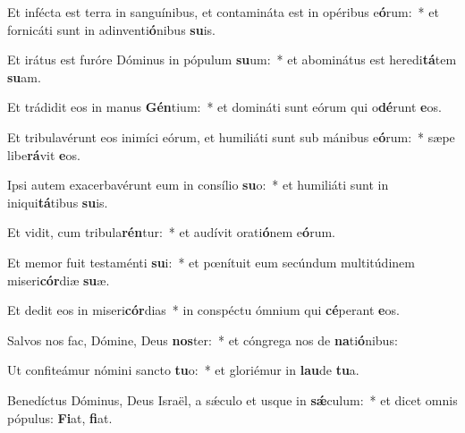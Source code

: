 \item Et infécta est terra in sanguínibus, et contamináta est in opéribus e\textbf{ó}rum:~* et fornicáti sunt in adinventi\textbf{ó}nibus \textbf{su}is.
\item Et irátus est furóre Dóminus in pópulum \textbf{su}um:~* et abominátus est heredi\textbf{tá}tem \textbf{su}am.
\item Et trádidit eos in manus \textbf{Gén}tium:~* et domináti sunt eórum qui o\textbf{dé}runt \textbf{e}os.
\item Et tribulavérunt eos inimíci eórum, et humiliáti sunt sub mánibus e\textbf{ó}rum:~* sæpe libe\textbf{rá}vit \textbf{e}os.
\item Ipsi autem exacerbavérunt eum in consílio \textbf{su}o:~* et humiliáti sunt in iniqui\textbf{tá}tibus \textbf{su}is.
\item Et vidit, cum tribula\textbf{rén}tur:~* et audívit orati\textbf{ó}nem e\textbf{ó}rum.
\item Et memor fuit testaménti \textbf{su}i:~* et pœnítuit eum secúndum multitúdinem miseri\textbf{cór}diæ \textbf{su}æ.
\item Et dedit eos in miseri\textbf{cór}dias~* in conspéctu ómnium qui \textbf{cé}perant \textbf{e}os.
\item Salvos nos fac, Dómine, Deus \textbf{nos}ter:~* et cóngrega nos de \textbf{na}ti\textbf{ó}nibus:
\item Ut confiteámur nómini sancto \textbf{tu}o:~* et gloriémur in \textbf{lau}de \textbf{tu}a.
\item Benedíctus Dóminus, Deus Israël, a sǽculo et usque in \textbf{sǽ}culum:~* et dicet omnis pópulus: \textbf{Fi}at, \textbf{fi}at.
